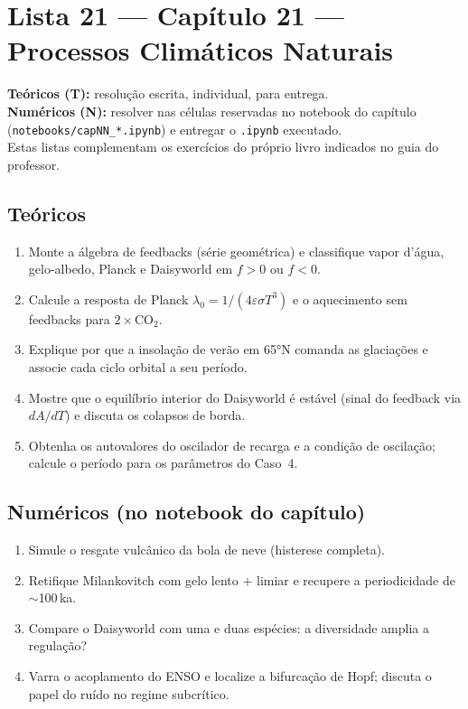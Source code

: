 \documentclass[11pt]{article}
\newcommand{\instrucoes}{%
\begin{caixalista}
\textbf{Teóricos (T):} resolução escrita, individual, para entrega.\\
\textbf{Numéricos (N):} resolver nas células reservadas no notebook do
capítulo (\texttt{notebooks/capNN\_*.ipynb}) e entregar o
\texttt{.ipynb} executado.\\
Estas listas complementam os exercícios do próprio livro indicados no
guia do professor.
\end{caixalista}}
\begin{document}
\clearpage
\section*{Lista 21 --- Capítulo 21 --- Processos Climáticos Naturais}
\instrucoes

\subsection*{Teóricos}

\begin{enumerate}[label=\textbf{T\arabic*.},itemsep=4pt]
  \item Monte a álgebra de feedbacks (série geométrica) e classifique
        vapor d'água, gelo-albedo, Planck e Daisyworld em $f>0$ ou
        $f<0$.
  \item Calcule a resposta de Planck
        $\lambda_0 = 1/(4\varepsilon\sigma T^3)$ e o aquecimento sem
        feedbacks para $2\times$CO$_2$.
  \item Explique por que a insolação de verão em 65°N comanda as
        glaciações e associe cada ciclo orbital a seu período.
  \item Mostre que o equilíbrio interior do Daisyworld é estável
        (sinal do feedback via $dA/dT$) e discuta os colapsos de
        borda.
  \item Obtenha os autovalores do oscilador de recarga e a condição
        de oscilação; calcule o período para os parâmetros do
        Caso~4.
\end{enumerate}

\subsection*{Numéricos (no notebook do capítulo)}

\begin{enumerate}[label=\textbf{N\arabic*.},itemsep=4pt]
  \item Simule o resgate vulcânico da bola de neve (histerese
        completa).
  \item Retifique Milankovitch com gelo lento $+$ limiar e recupere a
        periodicidade de $\sim$100\,ka.
  \item Compare o Daisyworld com uma e duas espécies: a diversidade
        amplia a regulação?
  \item Varra o acoplamento do ENSO e localize a bifurcação de Hopf;
        discuta o papel do ruído no regime subcrítico.
\end{enumerate}
\end{document}
